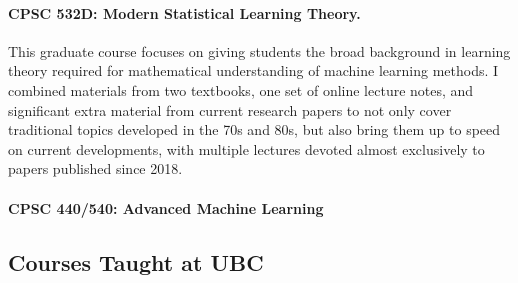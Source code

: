 \documentclass[10pt]{article}
\begin{document}
  \paragraph{CPSC 532D: Modern Statistical Learning Theory.}
  \continuing{}
  This graduate course focuses on
  giving students the broad background in learning theory
  required for mathematical understanding of machine learning methods.
  I combined materials from two textbooks, one set of online lecture notes, and significant extra material from current research papers to not only cover traditional topics developed in the 70s and 80s, but also bring them up to speed on current developments, with multiple lectures devoted almost exclusively to papers published since 2018.

  \paragraph{CPSC 440/540: Advanced Machine Learning}


\subsection{Courses Taught at UBC}
\end{document}
